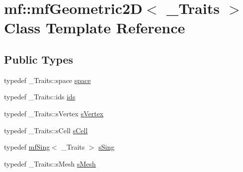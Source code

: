 \hypertarget{classmf_1_1mfGeometric2D}{
\section{mf::mfGeometric2D$<$ \_\-Traits $>$ Class Template Reference}
\label{classmf_1_1mfGeometric2D}
}
\subsection*{Public Types}
\begin{DoxyCompactItemize}
\item 
typedef \_\-Traits::space \hyperlink{classmf_1_1mfGeometric2D_a6e4fccf14c9c28a5be638f0254b5af07}{space}
\item 
typedef \_\-Traits::ids \hyperlink{classmf_1_1mfGeometric2D_a1a86a0d9076b7362d928c25126d18b7b}{ids}
\item 
typedef \_\-Traits::sVertex \hyperlink{classmf_1_1mfGeometric2D_ab23d81dfbcc3a52c64efb4857586d9f3}{sVertex}
\item 
typedef \_\-Traits::sCell \hyperlink{classmf_1_1mfGeometric2D_a545916ef70ee88b8be647a8950e2bc4f}{sCell}
\item 
typedef \hyperlink{classmf_1_1mfSing}{mfSing}$<$ \_\-Traits $>$ \hyperlink{classmf_1_1mfGeometric2D_a1ffdb4852b12eb804fbc0f68cab3937a}{sSing}
\item 
typedef \_\-Traits::sMesh \hyperlink{classmf_1_1mfGeometric2D_a5d9ae6b14eb6f0bad24d9a38567a9466}{sMesh}
\end{DoxyCompactItemize}
